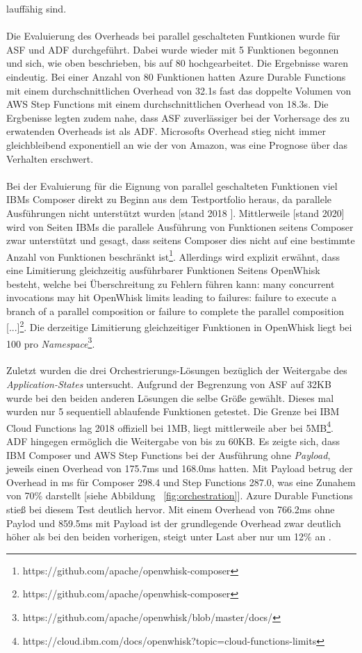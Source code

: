\documentclass[11pt]{article}
\begin{document}
lauffähig sind.\\\\ Die Evaluierung des Overheads bei parallel geschalteten Funtkionen wurde für ASF und ADF durchgeführt. Dabei wurde wieder mit 5 Funktionen begonnen und sich, wie oben beschrieben, bis auf 80 hochgearbeitet. Die Ergebnisse waren eindeutig. Bei einer Anzahl von 80 Funktionen hatten Azure Durable Functions mit einem durchschnittlichen Overhead von 32.1s fast das doppelte Volumen von AWS Step Functions mit einem durchschnittlichen Overhead von 18.3s. Die Ergbenisse legten zudem nahe, dass ASF zuverlässiger bei der Vorhersage des zu erwatenden Overheads ist als ADF. Microsofts Overhead stieg nicht immer gleichbleibend exponentiell an wie der von Amazon, was eine Prognose über das Verhalten erschwert.\\\\ Bei der Evaluierung für die Eignung von parallel geschalteten Funktionen viel IBMs Composer direkt zu Beginn aus dem Testportfolio heraus, da parallele Ausführungen nicht unterstützt wurden [stand 2018 \cite{lopez2018comparison}]. Mittlerweile [stand 2020] wird von Seiten IBMs die parallele Ausführung von Funktionen seitens Composer zwar unterstützt und gesagt, dass seitens Composer dies nicht auf eine bestimmte Anzahl von Funktionen beschränkt ist\footnote{https://github.com/apache/openwhisk-composer}. Allerdings wird explizit erwähnt, dass eine Limitierung gleichzeitig ausführbarer Funktionen Seitens OpenWhisk besteht, welche bei Überschreitung zu Fehlern führen kann: \glqq [...] many concurrent invocations may hit OpenWhisk limits leading to failures: failure to execute a branch of a parallel composition or failure to complete the parallel composition [...]\grqq{}\footnote{https://github.com/apache/openwhisk-composer}. Die derzeitige Limitierung gleichzeitiger Funktionen in OpenWhisk liegt bei 100 pro \textit{Namespace}\footnote{https://github.com/apache/openwhisk/blob/master/docs/}.\\\\ Zuletzt wurden die drei Orchestrierungs-Lösungen bezüglich der Weitergabe des \textit{Application-States} untersucht. Aufgrund der Begrenzung von ASF auf 32KB wurde bei den beiden anderen Lösungen die selbe Größe gewählt. Dieses mal wurden nur 5 sequentiell ablaufende Funktionen getestet. Die Grenze bei IBM Cloud Functions lag 2018 offiziell bei 1MB, liegt mittlerweile aber bei 5MB\footnote{https://cloud.ibm.com/docs/openwhisk?topic=cloud-functions-limits}. ADF hingegen ermöglich die Weitergabe von bis zu 60KB. Es zeigte sich, dass IBM Composer und AWS Step Functions bei der Ausführung ohne \textit{Payload}, jeweils einen Overhead von 175.7ms und 168.0ms hatten. Mit Payload betrug der Overhead in ms für Composer 298.4 und Step Functions 287.0, was eine Zunahem von 70\% darstellt [siehe Abbildung ~\ref{fig:orchestration}]. Azure Durable Functions stieß bei diesem Test deutlich hervor. Mit einem Overhead von 766.2ms ohne Paylod und 859.5ms mit Payload ist der grundlegende Overhead zwar deutlich höher als bei den beiden vorherigen, steigt unter Last aber nur um 12\% an \cite{lopez2018comparison}.
\end{document}
